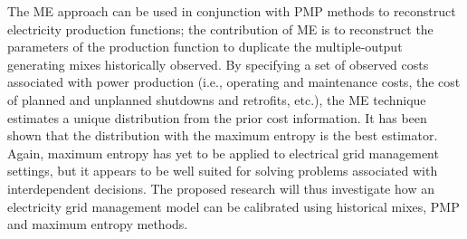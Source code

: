 The ME approach can be used in conjunction with PMP methods to
reconstruct electricity production functions; the contribution of ME is
to reconstruct the parameters of the production function to duplicate
the multiple-output generating mixes historically observed. By
specifying a set of observed costs associated with power production
(i.e., operating and maintenance costs, the cost of planned and
unplanned shutdowns and retrofits, etc.), the ME technique estimates a
unique distribution from the prior cost information. It has been shown
that the distribution with the maximum entropy is the best estimator.
Again, maximum entropy has yet to be applied to electrical grid
management settings, but it appears to be well suited for solving
problems associated with interdependent decisions. The proposed research
will thus investigate how an electricity grid management model can be
calibrated using historical mixes, PMP and maximum entropy methods.